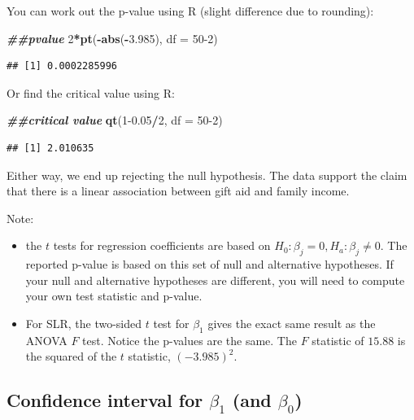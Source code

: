 \documentclass[
]{book}
\newenvironment{Shaded}{\begin{snugshade}}{\end{snugshade}}
\newcommand{\AttributeTok}[1]{\textcolor[rgb]{0.13,0.29,0.53}{#1}}
\newcommand{\DecValTok}[1]{\textcolor[rgb]{0.00,0.00,0.81}{#1}}
\newcommand{\DocumentationTok}[1]{\textcolor[rgb]{0.56,0.35,0.01}{\textbf{\textit{#1}}}}
\newcommand{\FloatTok}[1]{\textcolor[rgb]{0.00,0.00,0.81}{#1}}
\newcommand{\FunctionTok}[1]{\textcolor[rgb]{0.13,0.29,0.53}{\textbf{#1}}}
\newcommand{\NormalTok}[1]{#1}
\newcommand{\SpecialCharTok}[1]{\textcolor[rgb]{0.81,0.36,0.00}{\textbf{#1}}}
\begin{document}
You can work out the p-value using R (slight difference due to rounding):

\begin{Shaded}
\begin{Highlighting}[]
\DocumentationTok{\#\#pvalue}
\DecValTok{2}\SpecialCharTok{*}\FunctionTok{pt}\NormalTok{(}\SpecialCharTok{{-}}\FunctionTok{abs}\NormalTok{(}\SpecialCharTok{{-}}\FloatTok{3.985}\NormalTok{), }\AttributeTok{df =} \DecValTok{50{-}2}\NormalTok{)}
\end{Highlighting}
\end{Shaded}

\begin{verbatim}
## [1] 0.0002285996
\end{verbatim}

Or find the critical value using R:

\begin{Shaded}
\begin{Highlighting}[]
\DocumentationTok{\#\#critical value}
\FunctionTok{qt}\NormalTok{(}\DecValTok{1}\FloatTok{{-}0.05}\SpecialCharTok{/}\DecValTok{2}\NormalTok{, }\AttributeTok{df =} \DecValTok{50{-}2}\NormalTok{)}
\end{Highlighting}
\end{Shaded}

\begin{verbatim}
## [1] 2.010635
\end{verbatim}

Either way, we end up rejecting the null hypothesis. The data support the claim that there is a linear association between gift aid and family income.

Note:

\begin{itemize}
\item
  the \(t\) tests for regression coefficients are based on \(H_0: \beta_j = 0, H_a: \beta_j \neq 0\). The reported p-value is based on this set of null and alternative hypotheses. If your null and alternative hypotheses are different, you will need to compute your own test statistic and p-value.
\item
  For SLR, the two-sided \(t\) test for \(\beta_1\) gives the exact same result as the ANOVA \(F\) test. Notice the p-values are the same. The \(F\) statistic of \(15.88\) is the squared of the \(t\) statistic, \((-3.985)^2\).
\end{itemize}

\hypertarget{confidence-interval-for-beta_1-and-beta_0}{%
\subsection*{\texorpdfstring{Confidence interval for \(\beta_1\) (and \(\beta_0\))}{Confidence interval for \textbackslash beta\_1 (and \textbackslash beta\_0)}}\label{confidence-interval-for-beta_1-and-beta_0}}
\end{document}
